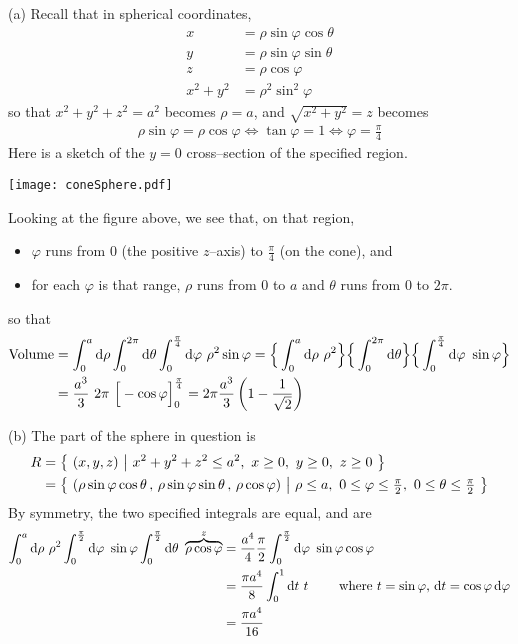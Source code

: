 \begin{solution}
(a)
Recall that in spherical coordinates,
\begin{align*}
x&=\rho\sin\varphi\cos\theta \\
y&=\rho\sin\varphi\sin\theta \\
z&=\rho\cos\varphi \\
x^2+y^2 &=\rho^2\sin^2\varphi
\end{align*}
so that $x^2+y^2+z^2= a^2$ becomes $\rho = a$,
and $\sqrt{x^2+y^2}= z$ becomes
\begin{align*}
\rho\sin\varphi = \rho\cos\varphi 
\iff
\tan\varphi= 1
\iff
\varphi=\frac{\pi}{4}
\end{align*}
Here is a sketch of the $y=0$ cross--section of the specified region.
\begin{center}
     \texttt{[image: coneSphere.pdf]}
\end{center}
Looking at the figure above, we see that, on that region,
\begin{itemize}
\item 
  $\varphi$ runs from $0$ (the positive $z$--axis) to
    $\frac{\pi}{4}$ (on the cone), and
\item
  for each $\varphi$ is that range, $\rho$ runs from $0$  to $a$
  and $\theta$ runs from $0$ to $2\pi$.
\end{itemize}
so that
\begin{align*}
\text{Volume} 
&= \int_{0}^{a}\mathrm{d}\rho  \int_{0}^{2\pi} \mathrm{d}\theta
\int_0^{{\pi\over 4}}\mathrm{d}\varphi\ \rho^2\sin\varphi
= \Big\{\int_{0}^{a}\mathrm{d}\rho\ \rho^2  \Big\}\Big\{\int_{0}^{2\pi} \mathrm{d}\theta\Big\}\Big\{
\int_0^{{\pi\over 4}}\mathrm{d}\varphi\ \sin\varphi\Big\} \\
&= \frac{a^3}{3}\ 2\pi\ \Big[-\cos\varphi\Big]_0^{{\pi\over 4}}
=2\pi\frac{a^3}{3}\left(1-\frac{1}{\sqrt{2}}\right)
\end{align*}

(b) The part of the sphere in question is
\begin{align*}
R&=\big\{ \ (x,y,z)\ \big|\ x^2+y^2+z^2\le a^2,\ x\ge0,\ y\ge 0,\ z\ge 0\ \big\} \\
 &=\big\{ \ (\rho\sin\varphi\cos\theta\,,\,
         \rho\sin\varphi\sin\theta\,,\,
         \rho\cos\varphi)\ \big|\ \rho\le a,\ 0\le\varphi\le\tfrac{\pi}{2},
             \ 0\le\theta\le\tfrac{\pi}{2}\ \big\} 
\end{align*}
By symmetry, the two specified integrals are equal, and are
\begin{align*}
 \int_{0}^{a}\dee{\rho}\ \rho^2 \int_0^{{\pi\over 2}}\dee{\varphi}\ \sin\varphi
\int_{0}^{{\pi\over 2}} \dee{\theta}\ \overbrace{\rho\cos\varphi}^{z}
&=\frac{a^4}{4}\frac{\pi}{2} \int_0^{{\pi\over 2}}\dee{\varphi}\ 
\sin\varphi\cos\varphi \\
&=\frac{\pi a^4}{8} \int_0^{1}\dee{t}\ t\qquad\hbox{ where $t=\sin\varphi$,
$\dee{t}=\cos\varphi\,\dee{\varphi}$} \\
&=\frac{\pi a^4}{16}
\end{align*}


\end{solution}
